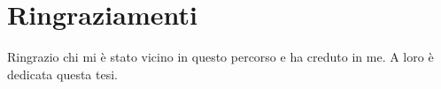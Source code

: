 \chapter*{Ringraziamenti}
Ringrazio chi mi è stato vicino in questo percorso e ha creduto in me. A loro è dedicata questa tesi.